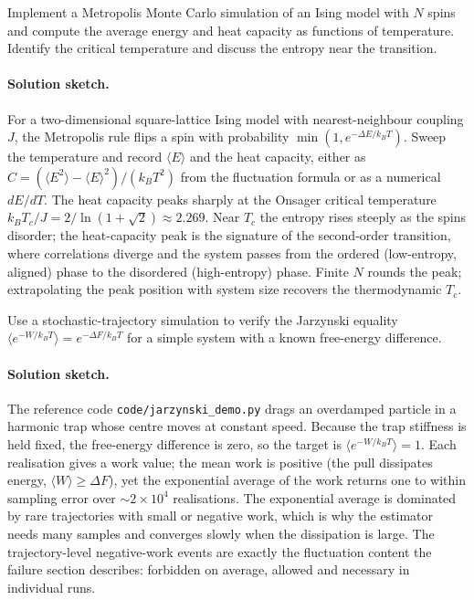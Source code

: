 \begin{exercise}
Implement a Metropolis Monte Carlo simulation of an Ising model with
$N$ spins and compute the average energy and heat capacity as
functions of temperature. Identify the critical temperature and
discuss the entropy near the transition.

\paragraph{Solution sketch.} For a two-dimensional square-lattice
Ising model with nearest-neighbour coupling $J$, the Metropolis rule
flips a spin with probability $\min(1, e^{-\Delta E/k_B T})$. Sweep the
temperature and record $\langle E \rangle$ and the heat capacity, either
as $C = (\langle E^2\rangle - \langle E\rangle^2)/(k_B T^2)$ from the
fluctuation formula or as a numerical $dE/dT$. The heat capacity peaks
sharply at the Onsager critical temperature
$k_B T_c/J = 2/\ln(1+\sqrt2) \approx 2.269$. Near $T_c$ the entropy
rises steeply as the spins disorder; the heat-capacity peak is the
signature of the second-order transition, where correlations diverge
and the system passes from the ordered (low-entropy, aligned) phase to
the disordered (high-entropy) phase. Finite $N$ rounds the peak;
extrapolating the peak position with system size recovers the
thermodynamic $T_c$.
\end{exercise}

\begin{exercise}
Use a stochastic-trajectory simulation to verify the Jarzynski
equality $\langle e^{-W/k_B T} \rangle = e^{-\Delta F/k_B T}$ for a
simple system with a known free-energy difference.

\paragraph{Solution sketch.} The reference code
\texttt{code/jarzynski\_demo.py} drags an overdamped particle in a
harmonic trap whose centre moves at constant speed. Because the trap
stiffness is held fixed, the free-energy difference is zero, so the
target is $\langle e^{-W/k_B T}\rangle = 1$. Each realisation gives a
work value; the mean work is positive (the pull dissipates energy,
$\langle W\rangle \ge \Delta F$), yet the exponential average of the
work returns one to within sampling error over $\sim 2\times10^4$
realisations. The exponential average is dominated by rare trajectories
with small or negative work, which is why the estimator needs many
samples and converges slowly when the dissipation is large. The
trajectory-level negative-work events are exactly the fluctuation
content the failure section describes: forbidden on average, allowed and
necessary in individual runs.
\end{exercise}

